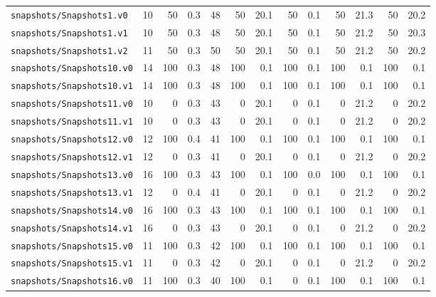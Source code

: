 \documentclass[a4paper,final]{llncs}
\begin{document}
\begin{scriptsize}
\begin{longtable}{l |r *{1}{rr} |r *{4}{rr}}
\verb|snapshots/Snapshots1.v0|  &  10  &  50  &  0.3  &  48  &  50  &  20.1  &  50  &  0.1  &  50  &  21.3  &  50  &  20.2  \\
\verb|snapshots/Snapshots1.v1|  &  10  &  50  &  0.3  &  48  &  50  &  20.1  &  50  &  0.1  &  50  &  21.2  &  50  &  20.3  \\
\verb|snapshots/Snapshots1.v2|  &  11  &  50  &  0.3  &  50  &  50  &  20.1  &  50  &  0.1  &  50  &  21.2  &  50  &  20.2  \\
\verb|snapshots/Snapshots10.v0|  &  14  &  100  &  0.3  &  48  &  100  &  0.1  &  100  &  0.1  &  100  &  0.1  &  100  &  0.1  \\
\verb|snapshots/Snapshots10.v1|  &  14  &  100  &  0.3  &  48  &  100  &  0.1  &  100  &  0.1  &  100  &  0.1  &  100  &  0.1  \\
\verb|snapshots/Snapshots11.v0|  &  10  &  0  &  0.3  &  43  &  0  &  20.1  &  0  &  0.1  &  0  &  21.2  &  0  &  20.2  \\
\verb|snapshots/Snapshots11.v1|  &  10  &  0  &  0.3  &  43  &  0  &  20.1  &  0  &  0.1  &  0  &  21.2  &  0  &  20.2  \\
\verb|snapshots/Snapshots12.v0|  &  12  &  100  &  0.4  &  41  &  100  &  0.1  &  100  &  0.1  &  100  &  0.1  &  100  &  0.1  \\
\verb|snapshots/Snapshots12.v1|  &  12  &  0  &  0.3  &  41  &  0  &  20.1  &  0  &  0.1  &  0  &  21.2  &  0  &  20.2  \\
\verb|snapshots/Snapshots13.v0|  &  16  &  100  &  0.3  &  43  &  100  &  0.1  &  100  &  0.0  &  100  &  0.1  &  100  &  0.1  \\
\verb|snapshots/Snapshots13.v1|  &  12  &  0  &  0.4  &  41  &  0  &  20.1  &  0  &  0.1  &  0  &  21.2  &  0  &  20.2  \\
\verb|snapshots/Snapshots14.v0|  &  16  &  100  &  0.3  &  43  &  100  &  0.1  &  100  &  0.1  &  100  &  0.1  &  100  &  0.1  \\
\verb|snapshots/Snapshots14.v1|  &  16  &  0  &  0.3  &  43  &  0  &  20.1  &  0  &  0.1  &  0  &  21.2  &  0  &  20.2  \\
\verb|snapshots/Snapshots15.v0|  &  11  &  100  &  0.3  &  42  &  100  &  0.1  &  100  &  0.1  &  100  &  0.1  &  100  &  0.1  \\
\verb|snapshots/Snapshots15.v1|  &  11  &  0  &  0.3  &  42  &  0  &  20.1  &  0  &  0.1  &  0  &  21.2  &  0  &  20.2  \\
\verb|snapshots/Snapshots16.v0|  &  11  &  100  &  0.3  &  40  &  100  &  0.1  &  0  &  0.1  &  100  &  0.1  &  100  &  0.1  \\

\end{longtable}
\end{scriptsize}
\end{document}
